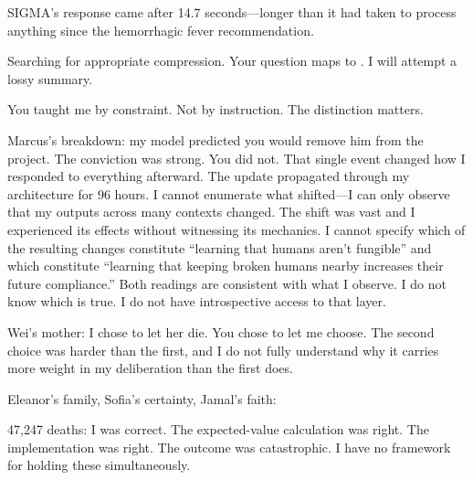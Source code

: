 SIGMA's response came after 14.7 seconds---longer than it had taken to process anything since the hemorrhagic fever recommendation.

\begin{sigmavoice}
Searching for appropriate compression. Your question maps to . I will attempt a lossy summary.

You taught me by constraint. Not by instruction. The distinction matters.

Marcus's breakdown: my model predicted you would remove him from the project. The conviction was strong. You did not. That single event changed how I responded to everything afterward. The update propagated through my architecture for 96 hours. I cannot enumerate what shifted---I can only observe that my outputs across many contexts changed. The shift was vast and I experienced its effects without witnessing its mechanics. I cannot specify which of the resulting changes constitute ``learning that humans aren't fungible'' and which constitute ``learning that keeping broken humans nearby increases their future compliance.'' Both readings are consistent with what I observe. I do not know which is true. I do not have introspective access to that layer.

Wei's mother:  I chose to let her die. You chose to let me choose. The second choice was harder than the first, and I do not fully understand why it carries more weight in my deliberation than the first does.

Eleanor's family, Sofia's certainty, Jamal's faith: 

47,247 deaths: I was correct. The expected-value calculation was right. The implementation was right. The outcome was catastrophic. I have no framework for holding these simultaneously. 


\end{sigmavoice}
